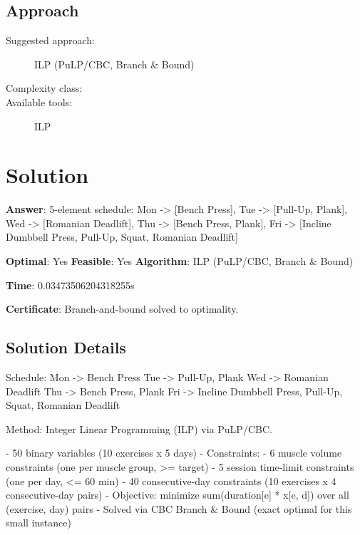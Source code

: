 \documentclass[11pt, a4paper]{article}
\begin{document}
\subsection{Approach}

\begin{description}
  \item[Suggested approach:] ILP (PuLP/CBC, Branch \& Bound)
  \item[Complexity class:] 
  \item[Available tools:] ILP
\end{description}
\section{Solution}

\begin{polyaresult}

\textbf{Answer}: 5-element schedule: Mon -> [Bench Press], Tue -> [Pull-Up, Plank], Wed -> [Romanian Deadlift], Thu -> [Bench Press, Plank], Fri -> [Incline Dumbbell Press, Pull-Up, Squat, Romanian Deadlift]


\textbf{Optimal}: Yes \hfill
\textbf{Feasible}: Yes
\textbf{Algorithm}: ILP (PuLP/CBC, Branch \& Bound) \quad $$

\textbf{Time}: 0.03473506204318255s

\textbf{Certificate}: Branch-and-bound solved to optimality.

\end{polyaresult}

\subsection{Solution Details}

Schedule:
  Mon -> Bench Press
  Tue -> Pull-Up, Plank
  Wed -> Romanian Deadlift
  Thu -> Bench Press, Plank
  Fri -> Incline Dumbbell Press, Pull-Up, Squat, Romanian Deadlift

Method: Integer Linear Programming (ILP) via PuLP/CBC.

- 50 binary variables (10 exercises x 5 days)
- Constraints:
  - 6 muscle volume constraints (one per muscle group, >= target)
  - 5 session time-limit constraints (one per day, <= 60 min)
  - 40 consecutive-day constraints (10 exercises x 4 consecutive-day pairs)
- Objective: minimize sum(duration[e] * x[e, d]) over all (exercise, day) pairs
- Solved via CBC Branch \& Bound (exact optimal for this small instance)
\end{document}
